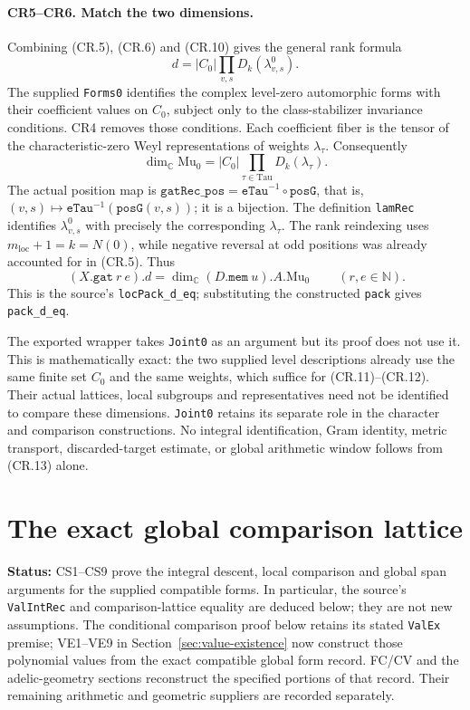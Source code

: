 \documentclass[11pt,a4paper]{article}
\numberwithin{equation}{section}
\theoremstyle{remark}\newtheorem{remark}[theorem]{Remark}
\newcommand{\status}[1]{\textbf{Status:} #1}
\begin{document}
\paragraph{CR5--CR6. Match the two dimensions.}
Combining (CR.5), (CR.6) and (CR.10) gives the general rank formula
\[
 \boxed{\ d=|C_0|\prod_{v,s}D_k(\lambda^0_{v,s}).\ }      \tag{CR.11}
\]
The supplied \texttt{Forms0} identifies the complex level-zero
automorphic forms with their coefficient values on $C_0$, subject
only to the class-stabilizer invariance conditions. CR4 removes
those conditions. Each coefficient fiber is the tensor of the
characteristic-zero Weyl representations of weights $\lambda_\tau$.
Consequently
\[
 \dim_{\mathbb C}\mathrm{Mu}_0
       =|C_0|\prod_{\tau\in\mathrm{Tau}}D_k(\lambda_\tau).
                                                               \tag{CR.12}
\]
The actual position map is
$\texttt{gatRec\_pos}=\texttt{eTau}^{-1}\circ\texttt{posG}$,
that is, $(v,s)\mapsto\texttt{eTau}^{-1}(\texttt{posG}(v,s))$;
it is a bijection. The definition \texttt{lamRec} identifies
$\lambda^0_{v,s}$ with precisely the corresponding $\lambda_\tau$.
The rank reindexing uses $m_{\mathrm{loc}}+1=k=N(0)$, while negative reversal at
odd positions was already accounted for in (CR.5). Thus
\[
 \boxed{\ (X.\texttt{gat}\ r\ e).d
          =\dim_{\mathbb C}(D.\texttt{mem}\ u).A.\mathrm{Mu}_0\ }
             \qquad(r,e\in\mathbb N).                    \tag{CR.13}
\]
This is the source's \texttt{locPack\_d\_eq}; substituting the
constructed \texttt{pack} gives \texttt{pack\_d\_eq}.

The exported wrapper takes \texttt{Joint0} as an argument but its
proof does not use it. This is mathematically exact: the two supplied
level descriptions already use the same finite set $C_0$ and the
same weights, which suffice for (CR.11)--(CR.12). Their actual
lattices, local subgroups and representatives need not be identified
to compare these dimensions. \texttt{Joint0} retains its separate
role in the character and comparison constructions. No integral
identification, Gram identity, metric transport, discarded-target
estimate, or global arithmetic window follows from (CR.13) alone.


\section{The exact global comparison lattice}
\label{sec:comparison-span}

\status{CS1--CS9 prove the integral descent, local comparison and
global span arguments for the supplied compatible forms. In particular,
the source's \texttt{ValIntRec} and comparison-lattice equality are
deduced below; they are not new assumptions. The conditional comparison proof below retains its stated
\texttt{ValEx} premise; VE1--VE9 in Section~\ref{sec:value-existence}
now construct those polynomial values from the exact compatible global
form record. FC/CV and the adelic-geometry sections reconstruct the
specified portions of that record. Their remaining arithmetic and
geometric suppliers are recorded separately.}
\end{document}
